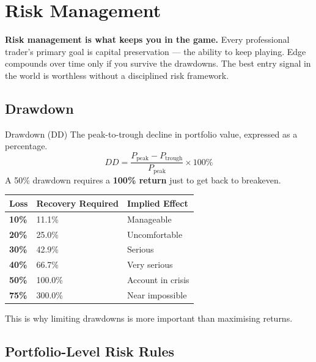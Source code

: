 
\chapter{Risk Management}

\begin{notebox}
\textbf{Risk management is what keeps you in the game.} Every professional trader's primary
goal is capital preservation — the ability to keep playing. Edge compounds over time only
if you survive the drawdowns. The best entry signal in the world is worthless without a
disciplined risk framework.
\end{notebox}

\section{Drawdown}

\begin{keyterm}{Drawdown (DD)}
The peak-to-trough decline in portfolio value, expressed as a percentage.
\[
  DD = \frac{P_{\text{peak}} - P_{\text{trough}}}{P_{\text{peak}}} \times 100\%
\]
A 50\% drawdown requires a \textbf{100\% return} just to get back to breakeven.
\end{keyterm}

\begin{center}
\begin{tabular}{>{\bfseries}p{3.5cm} p{4cm} p{5cm}}
\toprule
Loss & Recovery Required & Implied Effect \\
\midrule
10\% & 11.1\% & Manageable \\
20\% & 25.0\% & Uncomfortable \\
30\% & 42.9\% & Serious \\
40\% & 66.7\% & Very serious \\
50\% & 100.0\% & Account in crisis \\
75\% & 300.0\% & Near impossible \\
\bottomrule
\end{tabular}
\end{center}

This is why limiting drawdowns is more important than maximising returns.

\section{Portfolio-Level Risk Rules}

